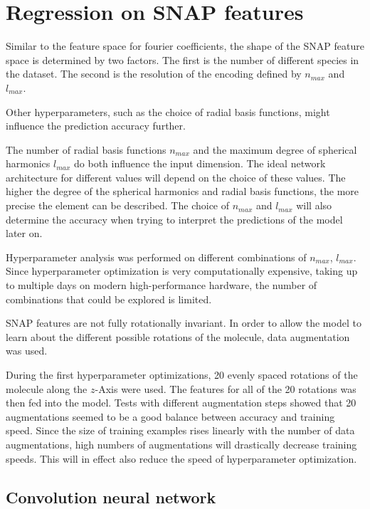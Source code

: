 \newpage
\section{Regression on SNAP features}
\label{sec:Evaluation:snap}

Similar to the feature space for fourier coefficients, the shape of the SNAP feature space is determined by two factors.
The first is the number of different species in the dataset.
The second is the resolution of the encoding defined by $n_{max}$ and $l_{max}$.

Other hyperparameters, such as the choice of radial basis functions, might influence the prediction accuracy further.

The number of radial basis functions $n_{max}$ and the maximum degree of spherical harmonics $l_{max}$ do both influence
the input dimension.
The ideal network architecture for different values will depend on the choice of these values.
The higher the degree of the spherical harmonics and radial basis functions, the more precise the element can be described. %
The choice of $n_{max}$ and $l_{max}$ will also determine the accuracy when trying to interpret the predictions of the model later on.

Hyperparameter analysis was performed on different combinations of $n_{max}$, $l_{max}$.
Since hyperparameter optimization is very computationally expensive, taking up to multiple days on modern high-performance hardware,
the number of combinations that could be explored is limited.

SNAP features are not fully rotationally invariant.
In order to allow the model to learn about the different possible rotations of the molecule, data augmentation was used.

During the first hyperparameter optimizations, 20 evenly spaced rotations of the molecule along the $z$-Axis were used.
The features for all of the 20 rotations was then fed into the model.
Tests with different augmentation steps showed that 20 augmentations seemed to be a good balance between 
accuracy and training speed.
Since the size of training examples rises linearly with the number of data augmentations,
high numbers of augmentations will drastically decrease training speeds.
This will in effect also reduce the speed of hyperparameter optimization.

\subsection{Convolution neural network}

